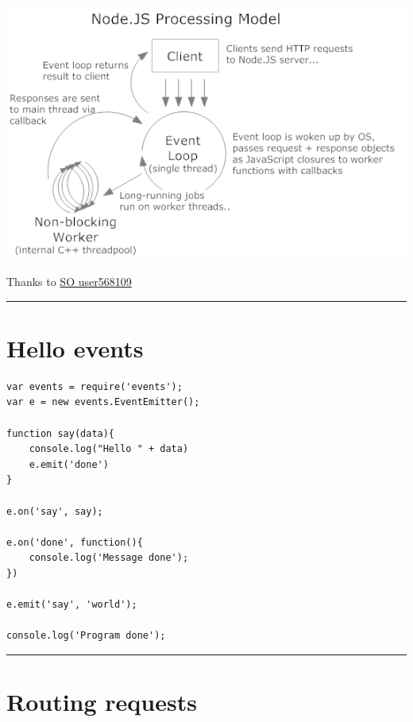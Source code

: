 \documentclass{article}[18pt]
\begin{document}
\begin{center}
	\includegraphics{image.png}
\end{center}





Thanks to
\href{http://stackoverflow.com/questions/14795145/how-the-single-threaded-non-blocking-io-model-works-in-node-js}{SO
	user568109}

\begin{center}\rule{0.5\linewidth}{\linethickness}\end{center}
\newpage
\hypertarget{hello-events}{%
	\section{Hello events}\label{hello-events}}

\begin{verbatim}
var events = require('events');
var e = new events.EventEmitter();

function say(data){
	console.log("Hello " + data)
	e.emit('done')
}

e.on('say', say);

e.on('done', function(){
	console.log('Message done');
})

e.emit('say', 'world');

console.log('Program done');
\end{verbatim}

\begin{center}\rule{0.5\linewidth}{\linethickness}\end{center}

\hypertarget{routing-requests}{%
	\section{Routing requests}\label{routing-requests}}
\end{document}
